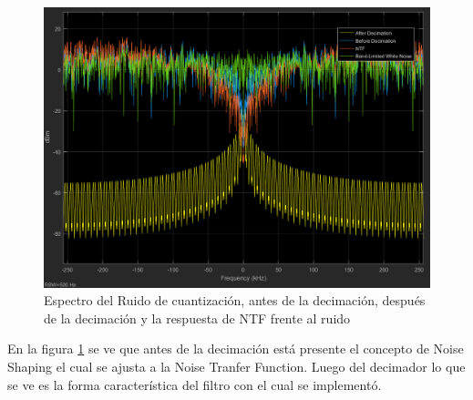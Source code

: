 \documentclass[assd_tp3_main.tex]{subfiles}
\begin{document}
\begin{figure}[H]
\centering
\includegraphics[width=0.9\linewidth]{images/ej4/NTF.png}
\caption{Espectro del Ruido de cuantización, antes de la decimación, después de la decimación y la respuesta de NTF frente al ruido}
\label{fig:NTF}
\end{figure}
En la figura \ref{fig:NTF} se ve que antes de la decimación está presente el concepto de Noise Shaping el cual se ajusta a la Noise Tranfer Function. Luego del decimador lo que se ve es la forma característica del filtro con el cual se implementó.
\end{document}
